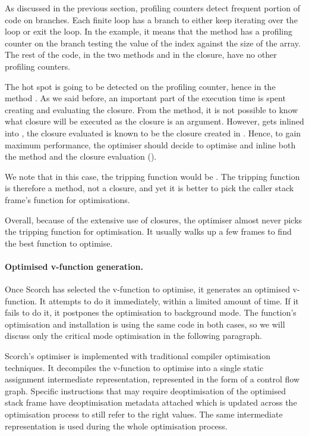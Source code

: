 \documentclass[a4paper,12pt,twoside]{../includes/ThesisStyle}
\begin{document}
As discussed in the previous section, profiling counters detect frequent portion of code on branches. Each finite loop has a branch to either keep iterating over the loop or exit the loop. In the example, it means that the method  has a profiling counter on the branch testing the value of the index against the size of the array. The rest of the code, in the two methods and in the closure, have no other profiling counters.

The hot spot is going to be detected on the profiling counter, hence in the method . As we said before, an important part of the execution time is spent creating and evaluating the closure. From the  method, it is not possible to know what closure will be executed as the closure is an argument. However,   gets inlined into , the closure evaluated is known to be the closure created in  . Hence, to gain maximum performance, the optimiser should decide to optimise  and inline both the  method and the closure evaluation (). 

We note that in this case, the tripping function would be . The tripping function is therefore a method, not a closure, and yet it is better to pick the caller stack frame's function for optimisations.

Overall, because of the extensive use of closures, the optimiser almost never picks the tripping function for optimisation. It usually walks up a few frames to find the best function to optimise. 

\paragraph{Optimised v-function generation.}
Once Scorch has selected the v-function to optimise, it generates an optimised v-function. It attempts to do it immediately, within a limited amount of time. If it fails to do it, it postpones the optimisation to background mode. The function's optimisation and installation is using the same code in both cases, so we will discuss only the critical mode optimisation in the following paragraph.

Scorch's optimiser is implemented with traditional compiler optimisation techniques. It decompiles the v-function to optimise into a single static assignment intermediate representation, represented in the form of a control flow graph. Specific instructions that may require deoptimisation of the optimised stack frame have deoptimisation metadata attached which is updated across the optimisation process to still refer to the right values. The same intermediate representation is used during the whole optimisation process.
\end{document}
